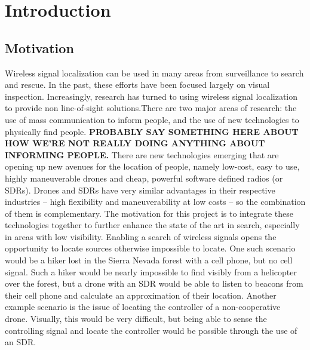 \chapter{Introduction}

\section{Motivation}
Wireless signal localization can be used in many areas from surveillance to search and rescue. In the past, these efforts have been focused largely on visual inspection. Increasingly, research has turned to using wireless signal localization to provide non line-of-sight solutions.There are two major areas of research: the use of mass communication to inform people, and the use of new technologies to physically find people. \textbf{PROBABLY SAY SOMETHING HERE ABOUT HOW WE’RE NOT REALLY DOING ANYTHING ABOUT INFORMING PEOPLE.} There are new technologies emerging that are opening up new avenues for the location of people, namely low-cost, easy to use, highly maneuverable drones and cheap, powerful software defined radios (or SDRs).
Drones and SDRs have very similar advantages in their respective industries – high flexibility and maneuverability at low costs – so the combination of them is complementary. The motivation for this project is to integrate these technologies together to further enhance the state of the art in search, especially in areas with low visibility. Enabling a search of wireless signals opens the opportunity to locate sources otherwise impossible to locate. One such scenario would be a hiker lost in the Sierra Nevada forest with a cell phone, but no cell signal. Such a hiker would be nearly impossible to find visibly from a helicopter over the forest, but a drone with an SDR would be able to listen to beacons from their cell phone and calculate an approximation of their location. Another example scenario is the issue of locating the controller of a non-cooperative drone. Visually, this would be very difficult, but being able to sense the controlling signal and locate the controller would be possible through the use of an SDR.\par

